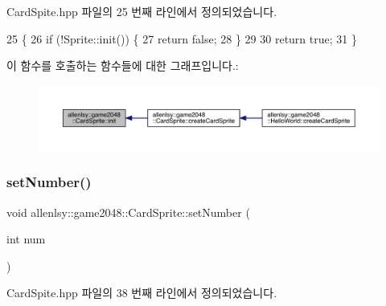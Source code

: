 Card\+Spite.\+hpp 파일의 25 번째 라인에서 정의되었습니다.


\begin{DoxyCode}
25                        \{
26         \textcolor{keywordflow}{if} (!Sprite::init()) \{
27         \textcolor{keywordflow}{return} \textcolor{keyword}{false};
28     \}
29 
30     \textcolor{keywordflow}{return} \textcolor{keyword}{true};
31     \}
\end{DoxyCode}
이 함수를 호출하는 함수들에 대한 그래프입니다.\+:
\nopagebreak
\begin{figure}[H]
\begin{center}
\leavevmode
\includegraphics[width=350pt]{d9/d22/classallenlsy_1_1game2048_1_1_card_sprite_ad6769d950c3b9b87092bd7e40d61dd4d_icgraph}
\end{center}
\end{figure}
\mbox{\label{classallenlsy_1_1game2048_1_1_card_sprite_a7f560bb8253477188273aac709aae087}} 
\subsubsection{\texorpdfstring{set\+Number()}{setNumber()}}
{\footnotesize\ttfamily void allenlsy\+::game2048\+::\+Card\+Sprite\+::set\+Number (\begin{DoxyParamCaption}\item[{int}]{num }\end{DoxyParamCaption})\hspace{0.3cm}{\ttfamily [inline]}}



Card\+Spite.\+hpp 파일의 38 번째 라인에서 정의되었습니다.


